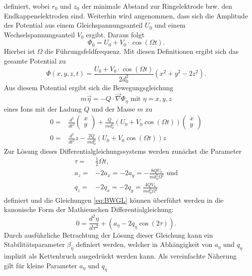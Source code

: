 \documentclass[numbers=noenddot,a4paper,notitlepage,twoside,BCOR15mm]{scrartcl}
\begin{document}
	definiert, wobei $r_0$ und $z_0$ der minimale Abstand zur Ringelektrode bzw. den Endkappenelektroden sind. Weiterhin wird angenommen, dass sich die Amplitude des Potential aus einem Gleichspannungsanteil $U_0$ und einem Wechselspannungsanteil $V_0$ ergibt. Daraus folgt
	\begin{equation}
		\Phi_0 = U_0 + V_0\cdot \cos(\Omega t).
	\end{equation}
	Hierbei ist $\Omega$ die Führungsfeldfrequenz. Mit diesen Definitionen ergibt sich das gesamte Potential zu
	\begin{equation}
		\Phi(x,y,z,t) = \frac{U_0+V_0 \cdot \cos(\Omega t)}{2 d_0^2}\left(x^2+y^2-2z^2\right).
	\end{equation}
	Aus diesem Potential ergibt sich die Bewegungsgleichung
	\begin{equation}
		m\ddot{\vec{\eta}} = -Q \cdot \vec{\nabla} \Phi_\eta \,\,\text{mit}\,\, \eta=x,y,z
	\end{equation}
	eines Ions mit der Ladung $Q$ und der Masse $m$ zu
	\begin{align}
	\label{eq:BWGL}
		0 =& \frac{d^2}{dt^2} \begin{pmatrix} x \\ y \end{pmatrix} +\frac{Q}{md^2_0}(U_0 + V_0\cos(\Omega t))\begin{pmatrix} x \\ y \end{pmatrix} \nonumber \\
		0 =& \frac{d^2}{dt^2} z -\frac{2Q}{md^2_0}(U_0 + V_0\cos(\Omega t))z
	\end{align}
	Zur Lösung dieses Differentialgleichungssystems werden zunächst die Parameter
	\begin{align}
		\label{eq:Parameter}
		\tau =& \frac{1}{2}\Omega t, \nonumber \\
		a_z =& -2a_x = -2a_y = -\frac{8QU_0}{md_0^2\Omega^2}\,\,\text{und} \\
		q_z =& -2q_x = -2q_y = \frac{4QV_0}{md_0^2\Omega^2} \nonumber
	\end{align}
	definiert und die Gleichungen \eqref{eq:BWGL} können überführt werden in die kanonische Form der Mathieuschen Differentialgleichung:
	\begin{equation}
		0 = \frac{d^2\eta}{d\tau^2}+\left(a_\eta-2q_\eta \cos\left(2\tau \right)\right).
	\end{equation}
	Durch ausführliche Betrachtung der Lösung dieser Gleichung kann ein Stabilitätsparameter $\beta_\eta$ definiert werden, welcher in Abhängigkeit von $a_\eta$ und $q_\eta$ implizit als Kettenbruch ausgedrückt werden kann. Als vereinfachte Näherung gilt für kleine Parameter $a_\eta$ und $q_\eta$
\end{document}
